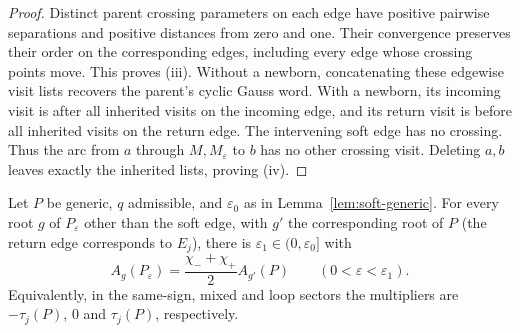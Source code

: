 \begin{proof}
Distinct parent crossing parameters on each edge have positive
pairwise separations and positive distances from zero and one.
Their convergence preserves their order on the corresponding
edges, including every edge whose crossing points move.
This proves (iii). Without a newborn, concatenating these
edgewise visit lists recovers the parent's cyclic Gauss word.
With a newborn, its incoming visit is after all inherited visits
on the incoming edge, and its return visit is before all inherited
visits on the return edge. The intervening soft edge has no crossing.
Thus the arc from $a$ through $M,M_\varepsilon$ to $b$ has no
other crossing visit. Deleting $a,b$ leaves exactly the inherited
lists, proving (iv).
\end{proof}

\begin{theorem}\label{thm:A-soft}
Let $P$ be generic, $q$ admissible, and $\varepsilon_0$ as in
Lemma~\ref{lem:soft-generic}. For every root $g$ of $P_\varepsilon$ other than
the soft edge, with $g'$ the corresponding root of $P$ (the return edge
corresponds to $E_j$), there is $\varepsilon_1\in(0,\varepsilon_0]$ with
\begin{equation}\label{aspr:soft-law}
A_g(P_\varepsilon)=\frac{\chi_-+\chi_+}{2}A_{g'}(P)
\qquad(0<\varepsilon<\varepsilon_1).
\end{equation}
Equivalently, in the same-sign, mixed and loop sectors the multipliers are
$-\tau_j(P)$, $0$ and $\tau_j(P)$, respectively.
\end{theorem}
